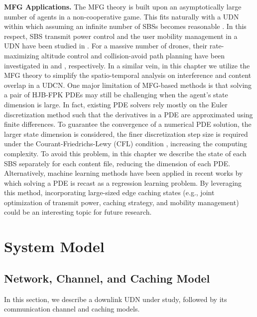 \documentclass{book}
\begin{document}
\textbf{MFG Applications.}\quad
The MFG theory is built upon an asymptotically large number of agents in a non-cooperative game. This fits naturally with a UDN within which assuming an infinite number of SBSs becomes reasonable \cite{UDN_sur,JensUdnMag,interf_udn,PIEEE2}. In this respect, SBS transmit power control and the user mobility management in a UDN have been studied in \cite{JHP1,JHP2}. For a massive number of drones, their rate-maximizing altitude control and collision-avoid path planning have been investigated in \cite{Alt} and \cite{SPAWC_hs,Hamid1, Hamid2,park2020extreme}, respectively. In a similar vein, in this chapter we utilize the MFG theory to simplify the spatio-temporal analysis on interference and content overlap in a UDCN. One major limitation of MFG-based methods is that solving a pair of HJB-FPK PDEs may still be challenging when the agent's state dimension is large. In fact, existing PDE solvers rely mostly on the Euler discretization method such that the derivatives in a PDE are approximated using finite differences. To guarantee the convergence of a numerical PDE solution, the larger state dimension is considered, the finer discretization step size is required under the Courant-Friedrichs-Lewy (CFL) condition \cite{CFL}, increasing the computing complexity. To avoid this problem, {in this chapter we describe the state of each SBS separately for each content file, reducing the dimension of each PDE.} Alternatively, machine learning methods have been applied in recent works \cite{Hamid1,Hamid2,Hamid3} by which solving a PDE is recast as a regression learning problem. By leveraging this method, incorporating large-sized edge caching states (e.g., joint optimization of transmit power, caching strategy, and mobility management) could be an interesting topic for future research.


\section{System Model}
\label{C_system_model}


\subsection{Network, Channel, and Caching Model}
In this section, we describe a downlink UDN under study, followed by its communication channel and caching models.
\end{document}
